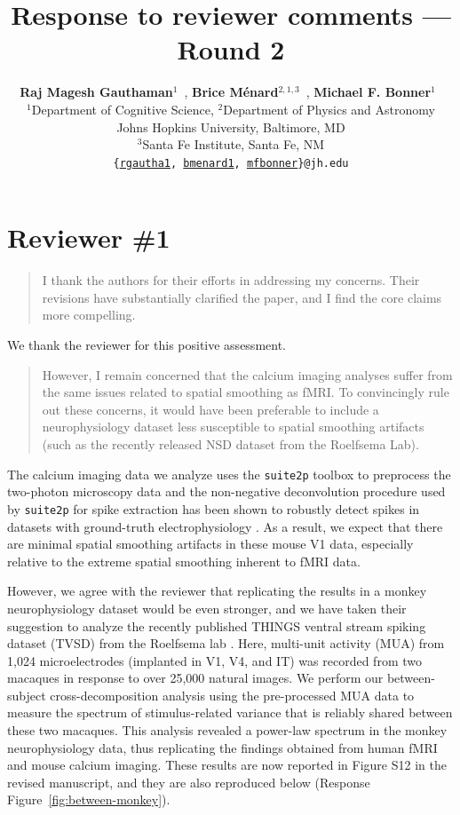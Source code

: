 \documentclass[10pt]{article}
\title{Response to reviewer comments --- Round 2}
\author{
    \textbf{Raj Magesh Gauthaman$^1$}~\orcidlink{0000-0001-7121-1532},
    \textbf{Brice Ménard$^{2,1,3}$}~\orcidlink{0000-0003-3164-6974},
    \textbf{Michael F. Bonner$^1$}~\orcidlink{0000-0002-4992-674X}\\
    $^1$Department of Cognitive Science,
    $^2$Department of Physics and Astronomy\\
    Johns Hopkins University, Baltimore, MD\\
    $^3$Santa Fe Institute, Santa Fe, NM\\
    \texttt{\{\href{mailto:rgautha1@jh.edu}{rgautha1}, \href{mailto:bmenard1@jh.edu}{bmenard1}, \href{mailto:mfbonner@jh.edu}{mfbonner}\}@jh.edu}
}
\date{}
\begin{document}
\maketitle

\section{Reviewer \#1}\label{reviewer-1}

\begin{quote}
I thank the authors for their efforts in addressing my concerns. Their revisions have substantially clarified the paper, and I find the core claims more compelling.
\end{quote}

We thank the reviewer for this positive assessment.

\begin{quote}
However, I remain concerned that the calcium imaging analyses suffer from the same issues related to spatial smoothing as fMRI. To convincingly rule out these concerns, it would have been preferable to include a neurophysiology dataset less susceptible to spatial smoothing artifacts (such as the recently released NSD dataset from the Roelfsema Lab).
\end{quote}

The calcium imaging data we analyze \autocite{Stringer2019} uses the \texttt{suite2p} toolbox \autocite{Pachitariu2016} to preprocess the two-photon microscopy data and the non-negative deconvolution procedure used by \texttt{suite2p} for spike extraction has been shown to robustly detect spikes in datasets with ground-truth electrophysiology \autocite{Pachitariu2018}. As a result, we expect that there are minimal spatial smoothing artifacts in these mouse V1 data, especially relative to the extreme spatial smoothing inherent to fMRI data.

However, we agree with the reviewer that replicating the results in a monkey neurophysiology dataset would be even stronger, and we have taken their suggestion to analyze the recently published THINGS ventral stream spiking dataset (TVSD) from the Roelfsema lab \autocite{Papale2025}. Here, multi-unit activity (MUA) from 1,024 microelectrodes (implanted in V1, V4, and IT) was recorded from two macaques in response to over 25,000 natural images. We perform our between-subject cross-decomposition analysis using the pre-processed MUA data to measure the spectrum of stimulus-related variance that is reliably shared between these two macaques. This analysis revealed a power-law spectrum in the monkey neurophysiology data, thus replicating the findings obtained from human fMRI and mouse calcium imaging. These results are now reported in Figure S12 in the revised manuscript, and they are also reproduced below (Response Figure~\ref{fig:between-monkey}).
\end{document}

